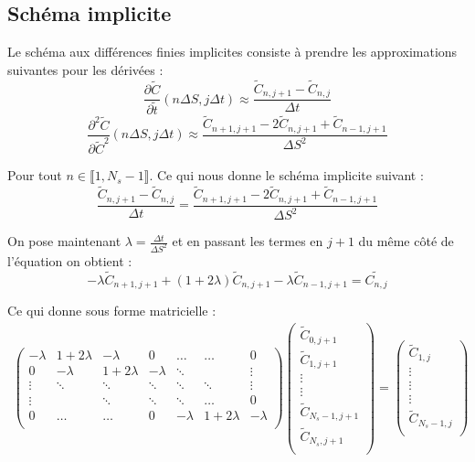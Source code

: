 \documentclass[11pt,a4paper]{article}
\begin{document}
\subsection{Schéma implicite}

Le schéma aux différences finies implicites consiste à prendre les approximations suivantes pour les dérivées :
\[\frac{\partial \tilde{C}}{\partial \tilde{t}}(n\Delta S, j\Delta t) \approx \frac{\tilde{C}_{n,j+1} - \tilde{C}_{n,j}}{\Delta t}\]
\[\frac{\partial^2 \tilde{C}}{\partial \tilde{C}^2}(n\Delta S, j\Delta t) \approx \frac{\tilde{C}_{n+1,j+1} - 2 \tilde{C}_{n,j+1} + \tilde{C}_{n-1,j+1}}{\Delta S^2}\]

Pour tout $n \in \llbracket 1,N_s - 1 \rrbracket$. Ce qui nous donne le schéma implicite suivant :
\[\frac{\tilde{C}_{n,j+1} - \tilde{C}_{n,j}}{\Delta t} = \frac{\tilde{C}_{n+1,j+1} - 2 \tilde{C}_{n,j+1} + \tilde{C}_{n-1,j+1}}{\Delta S^2}\]

On pose maintenant $\lambda = \frac{\Delta t}{\Delta S^2}$ et en passant les termes en $j+1$ du même côté de l'équation on obtient :
\[-\lambda \tilde{C}_{n+1,j+1} + (1 + 2\lambda)\tilde{C}_{n,j+1} -\lambda \tilde{C}_{n-1,j+1} = \tilde{C_{n,j}}\]

Ce qui donne sous forme matricielle :
\begin{align*}
\begin{pmatrix}
-\lambda & 1 + 2\lambda & -\lambda & 0 & \hdots & \hdots & 0 \\
0 & -\lambda & 1 + 2\lambda & -\lambda & \ddots  & & \vdots \\
\vdots & \ddots & \ddots & \ddots &\ddots &\ddots & \vdots \\
\vdots & 	 & \ddots & \ddots & \ddots & \hdots & 0 \\
0 & \hdots & \hdots & 0 & -\lambda & 1 + 2 \lambda & -\lambda\\
\end{pmatrix}
\begin{pmatrix}
\tilde{C}_{0,j+1} \\
\tilde{C}_{1,j+1} \\
\vdots \\
\vdots \\
\tilde{C}_{N_s - 1,j+1} \\
\tilde{C}_{N_s,j+1} \\
\end{pmatrix}
=
\begin{pmatrix}
\tilde{C}_{1,j} \\
\vdots \\
\vdots \\
\vdots \\
\tilde{C}_{N_s - 1,j} \\
\end{pmatrix}
\end{align*}
\end{document}
